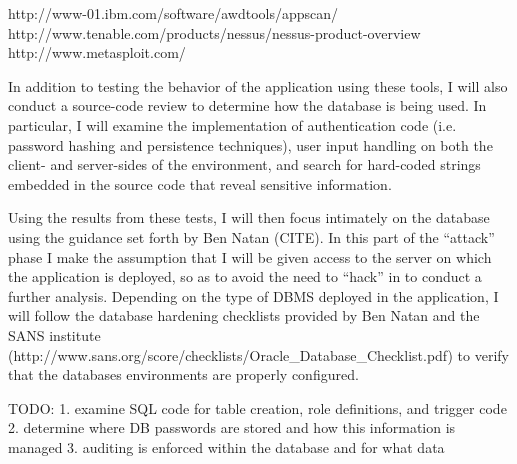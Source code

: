 \documentclass{sig-alternate}
\begin{document}
http://www-01.ibm.com/software/awdtools/appscan/
http://www.tenable.com/products/nessus/nessus-product-overview
http://www.metasploit.com/

In addition to testing the behavior of the application using these tools, I will also conduct a source-code review 
to determine how the database is being used. In particular, I will examine the implementation of authentication code
(i.e. password hashing and persistence techniques), user input handling on both the client- and server-sides of
the environment, and search for hard-coded strings embedded in the source code that reveal sensitive information.


Using the results from these tests, I will then focus intimately on the database using the guidance set forth by 
Ben Natan (CITE). In this part of the ``attack'' phase I make the assumption that I will be given access to the 
server on which the application is deployed, so as to avoid the need to ``hack'' in to conduct a further analysis. 
Depending on the type of DBMS deployed in the application, I will follow the database hardening checklists 
provided by Ben Natan 
and the SANS institute (http://www.sans.org/score/checklists/Oracle\_Database\_Checklist.pdf) to verify that the
databases environments are properly configured. 

TODO:
1. examine SQL code for table creation, role definitions, and trigger code
2. determine where DB passwords are stored and how this information is managed
3. auditing is enforced within the database and for what data

\balance
\end{document}
